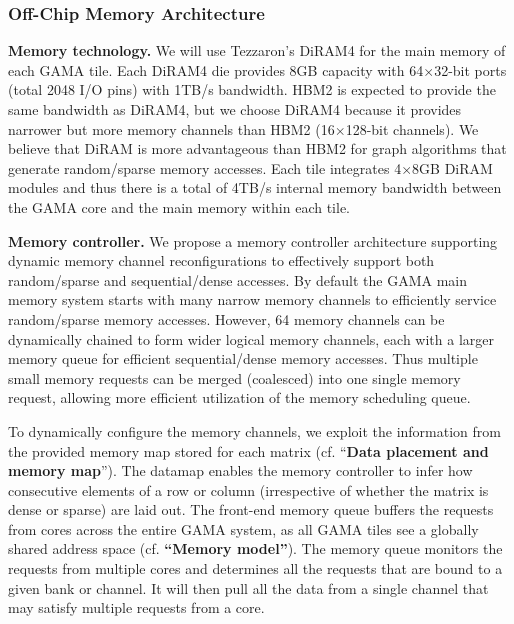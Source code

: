 \subsubsection{Off-Chip Memory Architecture} 
\label{sec:memory:off-chip}
\noindent
\textbf{Memory technology.} 
We will use  Tezzaron's DiRAM4 for the main memory of each GAMA tile.  
Each DiRAM4 die provides 8GB capacity with 64$\times$32-bit ports (total 2048 I/O pins) with 1TB/s bandwidth. 
HBM2 is expected to provide the same bandwidth as DiRAM4, but we choose DiRAM4 because it provides narrower but more memory channels than HBM2 (16$\times$128-bit channels). 
We believe that DiRAM is more advantageous than HBM2 for graph algorithms that generate random/sparse memory accesses. 
Each tile integrates 4$\times$8GB DiRAM modules and thus there is a total of 4TB/s internal memory bandwidth between the GAMA core and the main memory within each tile. 


\vspace{3pt}
\noindent
\textbf{Memory controller.} 
We propose a memory controller architecture supporting dynamic memory channel reconfigurations to effectively support both random/sparse and sequential/dense accesses.
By default the GAMA main memory system starts with many narrow memory channels to efficiently service random/sparse memory accesses.
However, %
64 memory channels can be dynamically chained to form wider logical memory channels, each with a larger memory queue for efficient sequential/dense memory accesses.
Thus multiple small memory requests can be merged (coalesced) into one single memory request, allowing more efficient utilization of the memory scheduling queue.


To dynamically configure the memory channels, we exploit the information from the provided memory map stored for each matrix (cf. ``\textbf{Data placement and memory map}'').
The datamap enables the memory controller to infer how consecutive elements of a row or column (irrespective of whether the matrix is dense or sparse) are laid out. 
The front-end memory queue buffers the requests from cores across the entire GAMA system, as all GAMA tiles see a globally shared address space (cf. \textbf{``Memory model''}). 
The memory queue monitors the requests from multiple cores and determines all the requests that are bound to a given bank or channel. 
It will then pull all the data from a single channel that may satisfy multiple requests from a core.  


